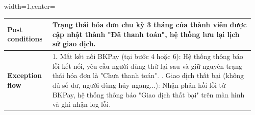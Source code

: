 \begin{adjustbox}{width=1\textwidth,center=\textwidth}
    \small
    \begin{tabular}{|>{\centering\arraybackslash}m{3.5cm}|m{13.2cm}|} 
        \hline
        \textbf{Post conditions} & Trạng thái hóa đơn chu kỳ 3 tháng của thành viên được cập nhật thành "Đã thanh toán", hệ thống lưu lại lịch sử giao dịch. \\ \hline
        \textbf{Exception flow} & 
        1. Mất kết nối BKPay (tại bước 4 hoặc 6): Hệ thống thông báo lỗi kết nối, yêu cầu người dùng thử lại sau và giữ nguyên trạng thái hóa đơn là "Chưa thanh toán". \newline
        2. Giao dịch thất bại (không đủ số dư, người dùng hủy ngang...): Nhận phản hồi lỗi từ BKPay, hệ thống thông báo "Giao dịch thất bại" trên màn hình và ghi nhận log lỗi. \\ \hline
    \end{tabular}
\end{adjustbox}

